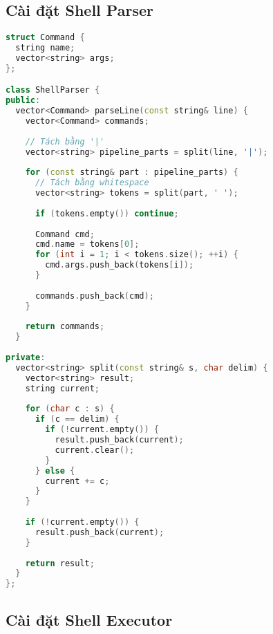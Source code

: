 \subsection{Cài đặt Shell Parser}

\begin{lstlisting}[language=C++,caption={Shell Parser}]
struct Command {
  string name;
  vector<string> args;
};

class ShellParser {
public:
  vector<Command> parseLine(const string& line) {
    vector<Command> commands;
    
    // Tách bằng '|'
    vector<string> pipeline_parts = split(line, '|');
    
    for (const string& part : pipeline_parts) {
      // Tách bằng whitespace
      vector<string> tokens = split(part, ' ');
      
      if (tokens.empty()) continue;
      
      Command cmd;
      cmd.name = tokens[0];
      for (int i = 1; i < tokens.size(); ++i) {
        cmd.args.push_back(tokens[i]);
      }
      
      commands.push_back(cmd);
    }
    
    return commands;
  }
  
private:
  vector<string> split(const string& s, char delim) {
    vector<string> result;
    string current;
    
    for (char c : s) {
      if (c == delim) {
        if (!current.empty()) {
          result.push_back(current);
          current.clear();
        }
      } else {
        current += c;
      }
    }
    
    if (!current.empty()) {
      result.push_back(current);
    }
    
    return result;
  }
};
\end{lstlisting}

\subsection{Cài đặt Shell Executor}

